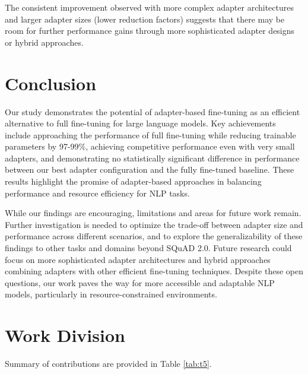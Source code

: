 \documentclass[conference]{IEEEtran}
\begin{document}
The consistent improvement observed with more complex adapter architectures and larger adapter sizes (lower reduction factors) suggests that there may be room for further performance gains through more sophisticated adapter designs or hybrid approaches.

\section{Conclusion}

Our study demonstrates the potential of adapter-based fine-tuning as an efficient alternative to full fine-tuning for large language models. Key achievements include approaching the performance of full fine-tuning while reducing trainable parameters by 97-99\%, achieving competitive performance even with very small adapters, and demonstrating no statistically significant difference in performance between our best adapter configuration and the fully fine-tuned baseline. These results highlight the promise of adapter-based approaches in balancing performance and resource efficiency for NLP tasks.

While our findings are encouraging, limitations and areas for future work remain. Further investigation is needed to optimize the trade-off between adapter size and performance across different scenarios, and to explore the generalizability of these findings to other tasks and domains beyond SQuAD 2.0. Future research could focus on more sophisticated adapter architectures and hybrid approaches combining adapters with other efficient fine-tuning techniques. Despite these open questions, our work paves the way for more accessible and adaptable NLP models, particularly in resource-constrained environments.

\section{Work Division}

Summary of contributions are provided in Table \ref{tab:t5}.
\end{document}
